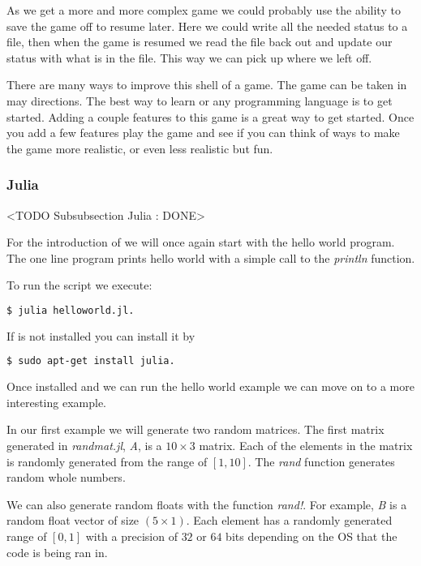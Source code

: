 As we get a more and more complex game we could probably use the ability to save the game off to resume later. Here we could write all the needed status to a file, then when the game is resumed we read the file back out and update our status with what is in the file. This way we can pick up where we left off. 

There are many ways to improve this shell of a game. The game can be taken in may directions. The best way to learn  or any programming language is to get started. Adding a couple features to this game is a great way to get started. Once you add a few features play the game and see if you can think of ways to make the game more realistic, or even less realistic but fun.

\subsubsection{Julia}
	<TODO Subsubsection  Julia : DONE>

For the introduction of \emph{} we will once again start with the hello world program. The one line program prints hello world with a simple call to the \emph{println} function. 
	
	

To run the  script we execute:

\begin{lstlisting}[language=bash]
    $ julia helloworld.jl.
\end{lstlisting}

If \emph{} is not installed you can install it by \cite{juliaref}

\begin{lstlisting}[language=bash]
    $ sudo apt-get install julia.
\end{lstlisting}

Once installed and we can run the hello world example we can move on to a more interesting example. 

In our first example we will generate two random matrices. The first matrix generated in \emph{randmat.jl}, \emph{A}, is a $10\times3$ matrix. Each of the elements in the matrix is randomly generated from the range of $[1, 10]$. The \emph{rand} function generates random whole numbers. 

We can also generate random floats with the function \emph{rand!}. For example, \emph{B} is a random float vector of size $(5\times1)$. Each element has a randomly generated range of $[0,1]$ with a precision of $32$ or $64$ bits depending on the \ac{OS} that the code is being ran in. 

